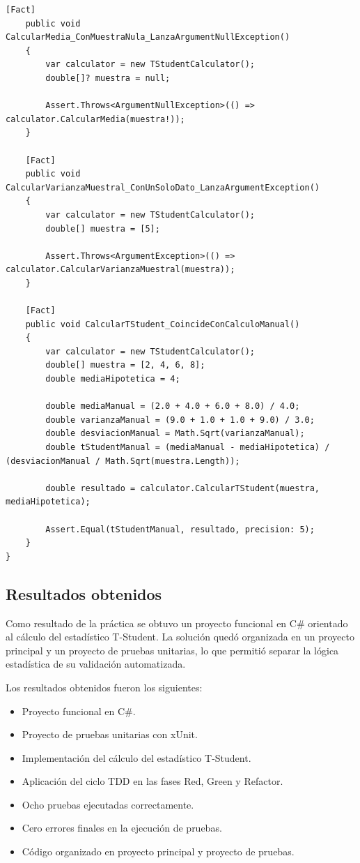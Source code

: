 \documentclass[12pt]{article}
\begin{document}
\begin{lstlisting}[language=CSharp, caption={Pruebas unitarias implementadas con xUnit}]
    [Fact]
    public void CalcularMedia_ConMuestraNula_LanzaArgumentNullException()
    {
        var calculator = new TStudentCalculator();
        double[]? muestra = null;

        Assert.Throws<ArgumentNullException>(() => calculator.CalcularMedia(muestra!));
    }

    [Fact]
    public void CalcularVarianzaMuestral_ConUnSoloDato_LanzaArgumentException()
    {
        var calculator = new TStudentCalculator();
        double[] muestra = [5];

        Assert.Throws<ArgumentException>(() => calculator.CalcularVarianzaMuestral(muestra));
    }

    [Fact]
    public void CalcularTStudent_CoincideConCalculoManual()
    {
        var calculator = new TStudentCalculator();
        double[] muestra = [2, 4, 6, 8];
        double mediaHipotetica = 4;

        double mediaManual = (2.0 + 4.0 + 6.0 + 8.0) / 4.0;
        double varianzaManual = (9.0 + 1.0 + 1.0 + 9.0) / 3.0;
        double desviacionManual = Math.Sqrt(varianzaManual);
        double tStudentManual = (mediaManual - mediaHipotetica) / (desviacionManual / Math.Sqrt(muestra.Length));

        double resultado = calculator.CalcularTStudent(muestra, mediaHipotetica);

        Assert.Equal(tStudentManual, resultado, precision: 5);
    }
}
\end{lstlisting}

\subsection{Resultados obtenidos}

Como resultado de la práctica se obtuvo un proyecto funcional en C\# orientado al cálculo del estadístico T-Student. La solución quedó organizada en un proyecto principal y un proyecto de pruebas unitarias, lo que permitió separar la lógica estadística de su validación automatizada.

Los resultados obtenidos fueron los siguientes:

\begin{itemize}
    \item Proyecto funcional en C\#.
    \item Proyecto de pruebas unitarias con xUnit.
    \item Implementación del cálculo del estadístico T-Student.
    \item Aplicación del ciclo TDD en las fases Red, Green y Refactor.
    \item Ocho pruebas ejecutadas correctamente.
    \item Cero errores finales en la ejecución de pruebas.
    \item Código organizado en proyecto principal y proyecto de pruebas.
\end{itemize}
\end{document}
